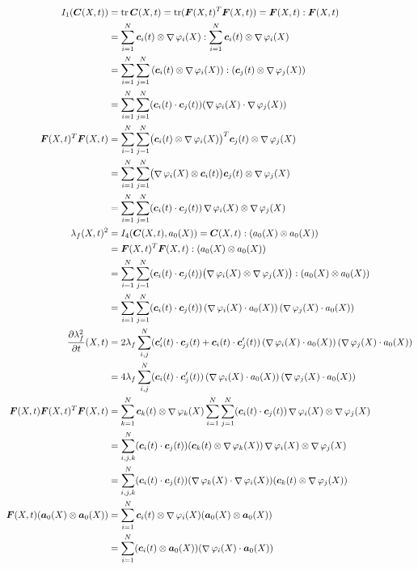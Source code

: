 \documentclass[a4paper,12pt]{article}
\DeclareMathOperator{\divergence}{\nabla}
\DeclareMathOperator{\tr}{tr}
\begin{document}
\begin{align}
	I_1(\vC(X,t)) &= \tr\vC(X,t) = \tr(\vF(X,t)^T\vF(X,t)) = \vF(X,t) : \vF(X,t)\nonumber\\
	&= \sumi \vc_i(t)\otimes \divergence\varphi_i(X) : \sumi \vc_i(t)\otimes \divergence\varphi_i(X)\nonumber\\
	&= \sumi\sumj \left(\vc_i(t)\otimes \divergence\varphi_i(X)\right) : (\vc_j(t)\otimes \divergence\varphi_j(X))\nonumber\\
	&= \sumi\sumj (\vc_i(t) \cdot \vc_j(t))(\divergence\varphi_i(X) \cdot \divergence\varphi_j(X))\label{eq:I1_basis}\\
	\vF(X,t)^T\vF(X,t) &= \sumi\sumj \bigl(\vc_i(t)\otimes\divergence\varphi_i(X)\bigr)^T\vc_j(t)\otimes\divergence\varphi_j(X)\nonumber\\
	 &= \sumi\sumj \bigl(\divergence\varphi_i(X)\otimes\vc_i(t)\bigr)\vc_j(t)\otimes\divergence\varphi_j(X)\nonumber\\
	 &=\sumi\sumj (\vc_i(t)\cdot \vc_j(t))\divergence\varphi_i(X)\otimes\divergence\varphi_j(X)\nonumber\\
	\lambda_f(X,t)^2 &=I_4(\vC(X,t),a_0(X)) = \vC(X,t):(a_0(X)\otimes a_0(X))\nonumber\\
			&=  \vF(X,t)^T\vF(X,t) : (a_0(X)\otimes a_0(X))\nonumber\\
			&=  \sumi\sumj (\vc_i(t)\cdot \vc_j(t))\bigl(\divergence\varphi_i(X)\otimes\divergence\varphi_j(X)\bigr) : (a_0(X)\otimes a_0(X))\nonumber\\
			&=  \sumi\sumj (\vc_i(t)\cdot \vc_j(t))\left(\divergence\varphi_i(X)\cdot a_0(X)\right)(\divergence\varphi_j(X)\cdot a_0(X))\label{eq:lambdaf_basis}\\
	\d{\lambda_f^2}{t}(X,t) &= 2\lambda_f \suml{i,j}{N} (\vc'_i(t)\cdot \vc_j(t) + \vc_i(t)\cdot \vc'_j(t))\left(\divergence\varphi_i(X)\cdot a_0(X)\right)(\divergence\varphi_j(X)\cdot a_0(X))\nonumber\\
		&= 4\lambda_f \suml{i,j}{N} (\vc_i(t)\cdot \vc'_j(t))\left(\divergence\varphi_i(X)\cdot a_0(X)\right)(\divergence\varphi_j(X)\cdot a_0(X))\nonumber\\
    \vF(X,t)\vF(X,t)^T\vF(X,t) &= \sumk\vc_k(t)\otimes\divergence\varphi_k(X)\sumi\sumj (\vc_i(t)\cdot \vc_j(t))\divergence\varphi_i(X)\otimes\divergence\varphi_j(X)\nonumber\\
    	&= \suml{i,j,k}{N}(\vc_i(t)\cdot \vc_j(t))(\vc_k(t)\otimes\divergence\varphi_k(X))\divergence\varphi_i(X)\otimes\divergence\varphi_j(X)\nonumber\\
    	&= \suml{i,j,k}{N}(\vc_i(t)\cdot \vc_j(t))(\divergence\varphi_k(X)\cdot\divergence\varphi_i(X))(\vc_k(t)\otimes\divergence\varphi_j(X))\nonumber\\
    \vF(X,t)(\va_0(X)\otimes\va_0(X)) &= \sumi \vc_i(t)\otimes \divergence\varphi_i(X)(\va_0(X)\otimes\va_0(X))\nonumber\\
    &= \sumi (\vc_i(t)\otimes \va_0(X))(\divergence\varphi_i(X)\cdot\va_0(X))\nonumber
\end{align}
\end{document}
